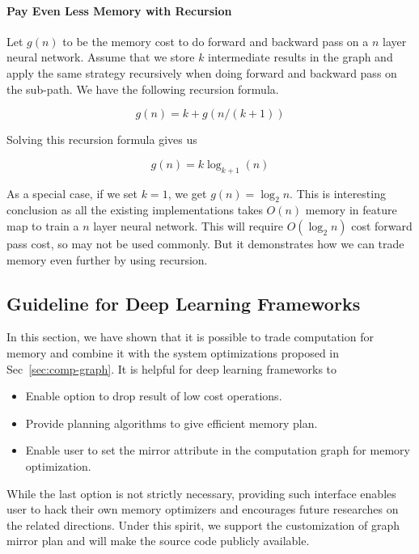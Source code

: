 \paragraph{Pay Even Less Memory with Recursion} Let $g(n)$ to be the memory cost to do forward and backward pass on a $n$ layer neural network. Assume that we store $k$ intermediate results in the graph and apply the same strategy recursively when doing forward and backward pass on the sub-path. We have the following recursion formula.

\begin{equation}
  g(n) = k + g\left(n / (k+1)\right)
\end{equation}

Solving this recursion formula gives us

\begin{equation}
  g(n) = k \log_{k+1} (n)
\end{equation}

As a special case, if we set $k = 1$, we get $g(n) = \log_2 n$. This is interesting conclusion as all the existing implementations takes $O(n)$ memory in feature map to train a $n$ layer neural network. This will require $O(\log_2 n)$ cost forward pass cost, so may not be used commonly. But it demonstrates how we can trade memory even further by using recursion.

\subsection{Guideline for Deep Learning Frameworks} In this section, we have shown that it is possible to trade computation for memory  and combine it with the system optimizations proposed in Sec~\ref{sec:comp-graph}. It is helpful for deep learning frameworks to

\begin{itemize}
\item Enable option to drop result of low cost operations.
\item Provide planning algorithms to give efficient memory plan.
\item Enable user to set the mirror attribute in the computation graph for memory optimization.
\end{itemize}

While the last option is not strictly necessary, providing such interface enables user to hack their own memory optimizers and encourages future researches on the related directions. Under this spirit, we support the customization of graph mirror plan and will make the source code publicly available.

